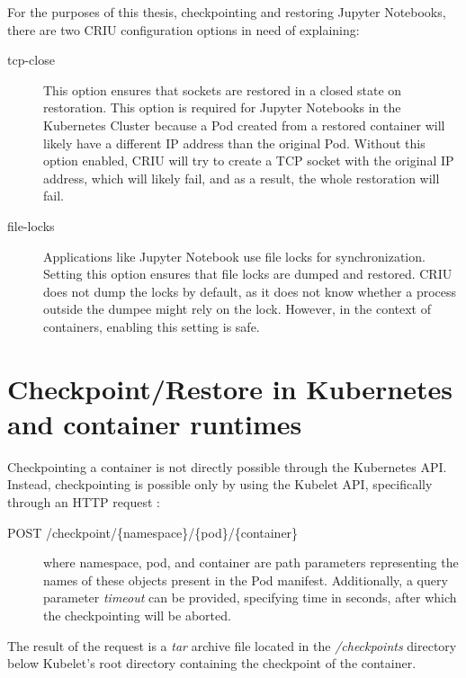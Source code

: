 \documentclass[
  digital,     %
  oneside,     %
  nosansbold,  %
  nocolorbold, %
  lof,         %
  lot,         %
]{fithesis4}
\begin{document}
For the purposes of this thesis, checkpointing and restoring Jupyter Notebooks, there are two CRIU configuration options in need of explaining:

\begin{description}

    \item[tcp-close] This option ensures that sockets are restored in a closed state on restoration. This option is required for Jupyter Notebooks in the Kubernetes Cluster because a Pod created from a restored container will likely have a different IP address than the original Pod. Without this option enabled, CRIU will try to create a TCP socket with the original IP address, which will likely fail, and as a result, the whole restoration will fail.
    
    \item[file-locks] Applications like Jupyter Notebook use file locks for synchronization. Setting this option ensures that file locks are dumped and restored. CRIU does not dump the locks by default, as it does not know whether a process outside the dumpee might rely on the lock. However, in the context of containers, enabling this setting is safe.

\end{description}


\section{Checkpoint/Restore in Kubernetes and container runtimes}
\label{sec:criu:kubernetes}

Checkpointing a container is not directly possible through the Kubernetes API. Instead, checkpointing is possible only by using the Kubelet API, specifically through an HTTP request \cite{k8s_kubelet_api}:

\begin{description}
    \item[POST /checkpoint/\{namespace\}/\{pod\}/\{container\}] where namespace, pod, and container are path parameters representing the names of these objects present in the Pod manifest. Additionally, a query parameter \emph{timeout} can be provided, specifying time in seconds, after which the checkpointing will be aborted.
\end{description}
The result of the request is a \emph{tar} archive file located in the \emph{/checkpoints} directory below Kubelet's root directory containing the checkpoint of the container.
\end{document}
